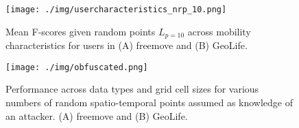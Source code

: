 \begin{figure}[H]
    \centering
    \texttt{[image: ./img/usercharacteristics\_nrp\_10.png]}
    \caption{Mean F-scores given random points $L_{p=10}$ across mobility characteristics for users in (A) freemove and (B) GeoLife.}
    \label{Figure:usercharacteristics_nrp_10}
\end{figure}


\begin{figure}[H]
    \centering
    \texttt{[image: ./img/obfuscated.png]}
    \caption{Performance across data types and grid cell sizes for various numbers of random spatio-temporal points assumed as knowledge of an attacker. (A) freemove and (B) GeoLife.}
    \label{Figure:obfuscated}
\end{figure}
